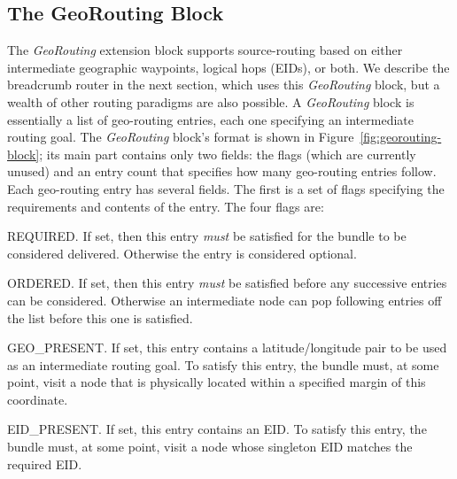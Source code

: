 \subsection{The GeoRouting Block}
\begin{sloppypar}
The {\em GeoRouting} extension block supports source-routing based on either intermediate geographic waypoints, logical hops (EIDs), or both.  We describe the {\sc breadcrumb} router in the next section, which uses this {\em GeoRouting} block, but a wealth of other routing paradigms are also possible. A {\em GeoRouting} block is essentially a list of geo-routing entries, each one specifying an intermediate routing goal. The {\em GeoRouting} block's format is shown in Figure~\ref{fig:georouting-block}; its main part contains only two fields: the flags (which are currently unused) and an entry count that specifies how many geo-routing entries follow.  Each geo-routing entry has several fields.  The first is a set of flags specifying the requirements and contents of the entry. The four flags are:
\begin{description*}
  \item[REQUIRED.] If set, then this entry {\it must} be satisfied for the bundle to be considered delivered.  Otherwise the entry is considered optional.
  \item[ORDERED.] If set, then this entry {\it must} be satisfied before any successive entries can be considered.  Otherwise an intermediate node can pop following entries off the list before this one is satisfied.
  \item[GEO\_PRESENT.] If set, this entry contains a latitude/longitude pair to be used as an intermediate routing goal.  To satisfy this entry, the bundle must, at some point, visit a node that is physically located within a specified margin of this coordinate.
  \item[EID\_PRESENT.] If set, this entry contains an EID.  To satisfy this entry, the bundle must, at some point, visit a node whose singleton EID matches the required EID.
\end{description*}
\end{sloppypar}

